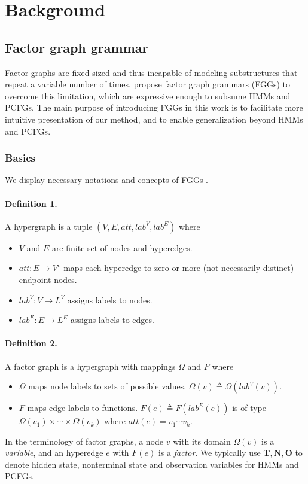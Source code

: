 \documentclass[11pt]{article}
\newcommand{\rv}[1]{\mathbf{#1}}
\begin{document}
\section{Background}
\subsection{Factor graph grammar}
Factor graphs are fixed-sized and thus incapable of modeling substructures that repeat a variable number of times.  \citet{DBLP:conf/nips/0001R20} propose factor graph grammars (FGGs) to overcome this limitation, which are expressive enough to subsume HMMs and PCFGs. The main purpose of introducing FGGs in this work is to facilitate more intuitive presentation of our method, and to enable generalization beyond HMMs and PCFGs.

\subsubsection{Basics}
 We display necessary notations and concepts of FGGs \cite[][]{DBLP:conf/nips/0001R20}.
\paragraph{Definition 1.} A hypergraph is a tuple $\left(V, E, a t t, l a b^{V}, l a b^{E}\right)$ where 
\begin{itemize}
    \item $V$ and $E$ are finite set of nodes and hyperedges.
    \item $att: E \rightarrow V^{\star}$ maps each hyperedge to zero or more (not necessarily distinct) endpoint nodes.
    \item $lab^V: V \rightarrow L^V$  assigns labels to nodes.
    \item $lab^E: E \rightarrow L^E$ assigns labels to edges.
\end{itemize}


\paragraph{Definition 2.} A factor graph is a hypergraph with mappings $\Omega$ and $F$ where
\begin{itemize}
    \item  $\Omega$ maps node labels to sets of possible values. $\Omega(v) \triangleq \Omega(lab^V(v))$.
    \item  $F$ maps edge labels to functions. $F(e) \triangleq F(lab^E(e))$ is of type $\Omega(v_1) \times \cdots \times \Omega(v_k)$ where $att(e) = v_1 \cdots v_k$.
\end{itemize}
In the terminology of factor graphs, a node $v$ with its domain $\Omega(v)$ is a \textit{variable}, and an hyperedge $e$ with $F(e)$ is a \textit{factor}.  We typically use $\rv{T}, \rv{N}, \rv{O}$ to denote hidden state, nonterminal state and observation variables for HMMs and PCFGs.
\end{document}
